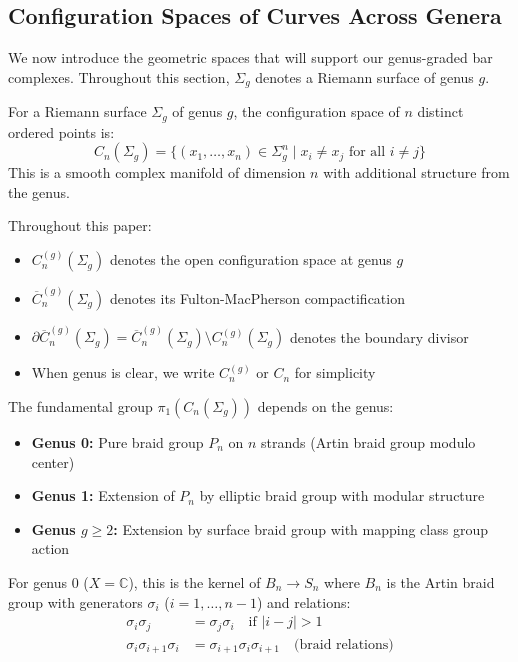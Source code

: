 \subsection{Configuration Spaces of Curves Across Genera}
 
We now introduce the geometric spaces that will support our genus-graded bar complexes. Throughout this section, $\Sigma_g$ denotes a Riemann surface of genus $g$.
 
\begin{definition}
For a Riemann surface $\Sigma_g$ of genus $g$, the configuration space of $n$ distinct ordered points is:
\[
C_n(\Sigma_g) = \{(x_1, \ldots, x_n) \in \Sigma_g^n \mid x_i \neq x_j \text{ for all } i \neq j\}
\]
This is a smooth complex manifold of dimension $n$ with additional structure from the genus.

\begin{notation}
Throughout this paper:
\begin{itemize}
\item $C_n^{(g)}(\Sigma_g)$ denotes the open configuration space at genus $g$
\item $\overline{C}_n^{(g)}(\Sigma_g)$ denotes its Fulton-MacPherson compactification  
\item $\partial\overline{C}_n^{(g)}(\Sigma_g) = \overline{C}_n^{(g)}(\Sigma_g) \setminus C_n^{(g)}(\Sigma_g)$ denotes the boundary divisor
\item When genus is clear, we write $C_n^{(g)}$ or $C_n$ for simplicity
\end{itemize}
\end{notation}

\end{definition}
 
\begin{proposition}
The fundamental group $\pi_1(C_n(\Sigma_g))$ depends on the genus:
\begin{itemize}
\item \textbf{Genus 0:} Pure braid group $P_n$ on $n$ strands (Artin braid group modulo center)
\item \textbf{Genus 1:} Extension of $P_n$ by elliptic braid group with modular structure
\item \textbf{Genus $g \geq 2$:} Extension by surface braid group with mapping class group action
\end{itemize}

For genus 0 ($X = \mathbb{C}$), this is the kernel of $B_n \to S_n$ where $B_n$ is the Artin braid group with generators $\sigma_i$ ($i = 1, \ldots, n-1$) and relations:
\begin{align}
\sigma_i\sigma_j &= \sigma_j\sigma_i \quad \text{if } |i-j| > 1 \\
\sigma_i\sigma_{i+1}\sigma_i &= \sigma_{i+1}\sigma_i\sigma_{i+1} \quad \text{(braid relations)}
\end{align}
\end{proposition}
 
